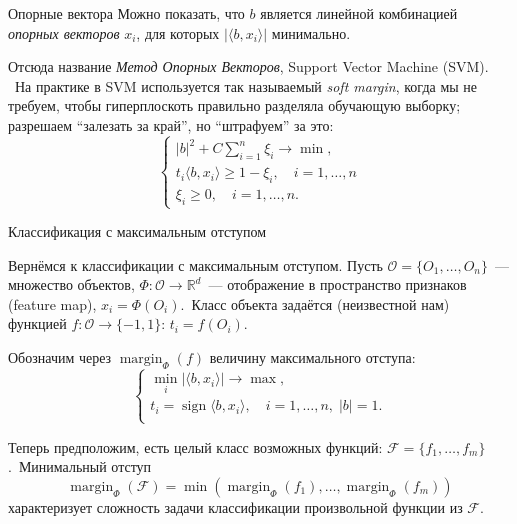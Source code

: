 \documentclass[handout]{beamer}
\renewcommand\ge{\geqslant}
\newcommand\R{\mathbb R}
\DeclareMathOperator{\sign}{sign}
\DeclareMathOperator{\margin}{margin}
\begin{document}
\begin{frame}{Опорные вектора}
    Можно показать, что $b$ является линейной комбинацией \textit{опорных
    векторов} $x_i$, для которых $|\langle b,x_i\rangle|$ минимально.
    \pause

    Отсюда название \textit{Метод Опорных Векторов}, Support Vector Machine
    (SVM). \pause~На практике в SVM используется так называемый \textit{soft margin}, когда
    мы не требуем, чтобы гиперплоскоть правильно разделяла обучающую выборку;
    разрешаем ``залезать за край'', но ``штрафуем'' за это:
    \pause
    $$
    \begin{cases}
    |b|^2 + C\sum_{i=1}^n\xi_i \to \min,\\
    t_i \langle b,x_i\rangle \ge 1-\xi_i,\quad i=1,\ldots,n\\
    \xi_i \ge 0,\quad i=1,\ldots,n.
    \end{cases}
    $$

\end{frame}

\begin{frame}{Классификация с максимальным отступом}
    
    Вернёмся к классификации с максимальным отступом. Пусть $\mathcal
    O=\{O_1,\ldots,O_n\}$~--- множество объектов\pause, $\Phi\colon\mathcal O\to\R^d$~---
    отображение в пространство признаков (feature map), $x_i=\Phi(O_i)$.\pause~Класс объекта задаётся
    (неизвестной нам) функцией $f\colon\mathcal O\to\{-1,1\}$: $t_i=f(O_i)$.
    \pause
    
    Обозначим через $\margin_\Phi(f)$ величину максимального отступа:
    $$
    \begin{cases}
        \min\limits_i |\langle b,x_i\rangle| \to \max,\\
        t_i=\sign \langle b,x_i\rangle,\quad i=1,\ldots,n,\;|b|=1.\\
    \end{cases}
    $$
    \pause

    Теперь предположим, есть целый класс возможных функций: $\mathcal
    F=\{f_1,\ldots,f_m\}$.\pause~Минимальный отступ
    $$
    \margin_\Phi(\mathcal F)=\min(\margin_\Phi(f_1),\ldots,\margin_\Phi(f_m))
    $$
    характеризует сложность задачи классификации произвольной функции из
    $\mathcal F$.
\end{frame}
\end{document}
